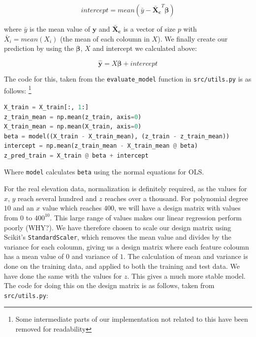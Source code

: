 \documentclass[twocolumn,10pt,cleanfoot]{asme2ej}
\begin{document}
\begin{equation}
	intercept = mean(\bar{y} - \bm{\bar{X}_c}^T \bm{\beta})
\end{equation}

	where $\bar{y}$ is the mean value of $\bm{y}$ and $\bm{\bar{X}_c}$ is a vector of size $p$ with $\bar{X}_i = mean(X_i)$ (the mean of each coloumn in $X$). We finally create our prediction by using the $\bm{\beta}$, $X$ and intercept we calculated above:

\begin{equation}
	\bm{\hat{y}} = X \bm{\beta} + intercept
\end{equation}

The code for this, taken from the \texttt{evaluate\_model} function in \texttt{src/utils.py} is as follows: \footnote{Some intermediate parts of our implementation not related to this have been removed for readability}

\begin{lstlisting}[language=Python]
X_train = X_train[:, 1:]
z_train_mean = np.mean(z_train, axis=0)
X_train_mean = np.mean(X_train, axis=0)
beta = model((X_train - X_train_mean), (z_train - z_train_mean))
intercept = np.mean(z_train_mean - X_train_mean @ beta)
z_pred_train = X_train @ beta + intercept
\end{lstlisting}

Where \texttt{model} calculates \texttt{beta} using the normal equations for OLS.

For the real elevation data, normalization is definitely required, as the values for $x$, $y$ reach several hundred and $z$ reaches over a thousand. For polynomial degree $10$ and an $x$ value which reaches $400$, we will have a design matrix with values from $0$ to $400^{10}$. This large range of values makes our linear regression perform poorly (WHY?). We have therefore chosen to scale our design matrix using Scikit's \texttt{StandardScaler}, which removes the mean value and divides by the variance for each coloumn, giving us a design matrix where each feature coloumn has a mean value of $0$ and variance of $1$. The calculation of mean and variance is done on the training data, and applied to both the training and test data. We have done the same with the values for $z$. This gives a much more stable model. The code for doing this on the design matrix is as follows, taken from \texttt{src/utils.py}:


\end{document}
